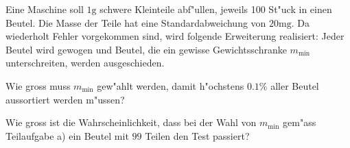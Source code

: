 Eine Maschine soll $1\text{g}$ schwere Kleinteile abf"ullen, 
jeweils 100 St"uck in einen Beutel.
Die Masse der Teile hat eine Standardabweichung von $20\text{mg}$.
Da wiederholt Fehler vorgekommen sind,
wird folgende Erweiterung realisiert: Jeder Beutel wird gewogen und
Beutel, die ein gewisse Gewichtsschranke $m_{\text{min}}$ unterschreiten,
werden ausgeschieden.
\begin{teilaufgaben}
\item Wie gross muss $m_{\text{min}}$ gew"ahlt werden, damit h"ochstens
$0.1\%$ aller Beutel aussortiert werden m"ussen?
\item Wie gross ist die Wahrscheinlichkeit, dass bei der Wahl von
$m_{\text{min}}$ gem"ass Teilaufgabe a) ein Beutel mit $99$ Teilen den
Test passiert?
\end{teilaufgaben}

